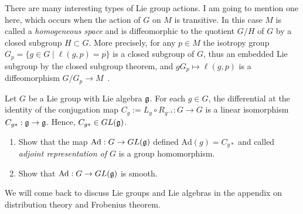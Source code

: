 There are many interesting types of Lie group actions. I am going to mention one here, which occurs when the action of $G$ on $M$ is transitive.
In this case $M$ is called a \emph{homogeneous space} and is diffeomorphic to the quotient $G/H$ of $G$ by a closed subgroup $H\subset G$.
More precisely, for any $p\in M$ the isotropy group $G_p = \{g\in G \mid \ell(g,p) = p\}$ is a closed subgroup of $G$, thus an embedded Lie subgroup by the closed subgroup theorem, and $gG_p\mapsto \ell(g,p)$ is a diffeomorphism $G/G_p\to M$~\cite[Theorem 21.18]{book:lee}.

\begin{exercise}
	Let $G$ be a Lie group with Lie algebra $\mathfrak{g}$.
	For each $g\in G$, the differential at the identity of the conjugation map $C_g:=L_g\circ R_{g^{-1}}: G\to G$ is a linear isomorphism $C_{g*}:\mathfrak{g}\to\mathfrak{g}$.
	Hence, $C_{g*}\in GL(\mathfrak{g})$.
	\begin{enumerate}
		\item Show that the map $\mathrm{Ad}:G\to GL(\mathfrak{g})$ defined $\mathrm{Ad}(g) = C_{g*}$ and called \emph{adjoint representation of $G$} is a group homomorphism.
		\item Show that $\mathrm{Ad}:G\to GL(\mathfrak{g})$ is smooth.
	\end{enumerate}
\end{exercise}

We will come back to discuss Lie groups and Lie algebras in the appendix on distribution theory and Frobenius theorem.
